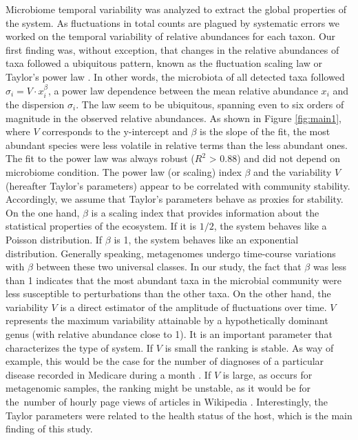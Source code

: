 Microbiome temporal variability was analyzed to extract the global properties of the system. As fluctuations in total counts are plagued by systematic errors we worked on the temporal variability of relative abundances for each taxon. Our first finding was, without exception, that changes in the relative abundances of taxa followed a ubiquitous pattern, known as the fluctuation scaling law \cite{fs} or Taylor's power law \cite{taylor}. In other words, the microbiota of all detected taxa followed $\sigma_i  = V\cdot x_i^{\beta}$, a power law dependence between the mean relative abundance $x_i$ and the dispersion $\sigma_i$. The law seem to be ubiquitous, spanning even to six orders of magnitude in the observed relative abundances. As shown in Figure \ref{fig:main1}, where $V$ corresponds to the y-intercept and $\beta$ is the slope of the fit, the most abundant species were less volatile in relative terms than the less abundant ones. The fit to the power law was always robust ($R^{2}$ > 0.88) and did not depend on microbiome condition. The power law (or scaling) index $\beta$ and the variability $V$ (hereafter Taylor's parameters) appear to be correlated with community stability. Accordingly, we assume that Taylor's parameters behave as proxies for stability. On the one hand, $\beta$ is a scaling index that provides information about the statistical properties of the ecosystem. If it is $1/2$, the system behaves like a Poisson distribution. If $\beta$ is 1, the system behaves like an exponential distribution. Generally speaking, metagenomes undergo time-course variations with $\beta$ between these two universal classes. In our study, the fact that $\beta$ was less than 1 indicates that the most abundant taxa in the microbial community were less susceptible to perturbations than the other taxa. On the other hand, the variability $V$ is a direct estimator of the amplitude of fluctuations over time. $V$ represents the maximum variability attainable by a hypothetically dominant genus (with relative abundance close to 1). It is an important parameter that characterizes the type of system. If $V$ is small the ranking is stable. As way of example, this would be the case for the number of diagnoses of a particular disease recorded in Medicare during a month \cite{medicare}. If $V$ is large, as occurs for metagenomic samples, the ranking might be unstable, as it would be for the number of hourly page views of articles in Wikipedia \cite{ranking,fs}. Interestingly, the Taylor parameters were related to the health status of the host, which is the main finding of this study.

